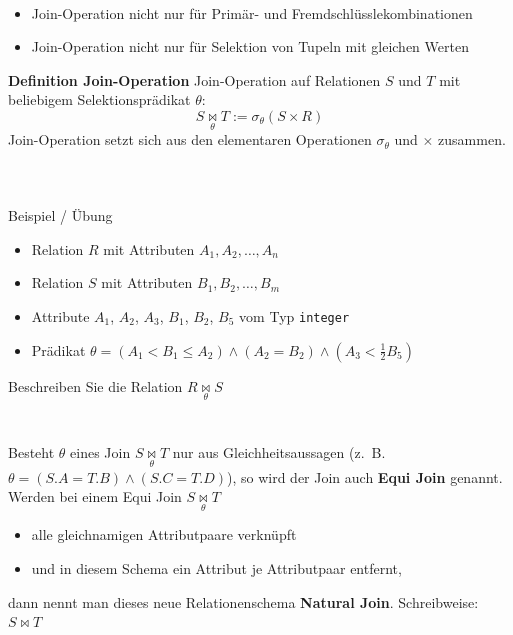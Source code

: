\begin{frame}\frametitle{\insertsection}
\framesubtitle{\insertsubsection}
\\[8pt]
\begin{itemize}
	\item Join-Operation nicht nur f\"ur Prim\"ar- und Fremdschl\"usslekombinationen
	\item Join-Operation nicht nur f\"ur Selektion von Tupeln mit gleichen Werten
\end{itemize}
\abs
\textbf{Definition Join-Operation}
\abs
Join-Operation auf Relationen $S$ und $T$ mit beliebigem Selektionspr\"adikat $\theta$:
\begin{equation*}
S \underset{\theta}{\Join} T := \sigma_{\theta}(S\times R)
\end{equation*}
Join-Operation setzt sich aus den elementaren Operationen $\sigma_\theta$ und $\times$ zusammen.
\end{frame}

\begin{frame}\frametitle{\insertsection}
\framesubtitle{\insertsubsection}
\\[8pt]
\begin{alertblock}{Beispiel / \"Ubung}
	\begin{itemize}
		\item Relation $R$ mit Attributen $A_1, A_2,\ldots , A_n$
		\item Relation $S$ mit Attributen $B_1, B_2,\ldots , B_m$
		\item Attribute $A_1$, $A_2$, $A_3$, $B_1$, $B_2$, $B_5$ vom Typ \texttt{integer}
		\item Pr\"adikat $\theta = (A_1 < B_1 \le A_2) \wedge (A_2=B_2) \wedge (A_3 < \frac{1}{2} B_5)$
	\end{itemize}
	\abs
	Beschreiben Sie die Relation $R\underset{\theta}{\Join} S$
\end{alertblock}
\end{frame}

\begin{frame}
\frametitle{\insertsection}
\framesubtitle{\insertsubsection}
\onslide
{}\\[8pt]
Besteht $\theta$ eines Join $S \underset{\theta}{\Join} T$
nur aus Gleichheitsaussagen (z.~B.~$\theta = (S.A=T.B) \wedge (S.C=T.D)$), so wird der Join auch 
\textbf{Equi Join} genannt.
\pause
\abs\abs
Werden bei einem Equi Join $S \underset{\theta}{\Join} T$
\begin{itemize}
	\item alle gleichnamigen Attributpaare verkn\"upft 
	\item und in diesem Schema ein Attribut je Attributpaar entfernt,
\end{itemize}
dann nennt man dieses neue Relationenschema \textbf{Natural Join}. Schreibweise: $S \Join T$
\end{frame}

